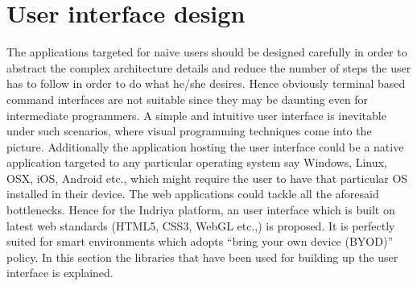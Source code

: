 % 
\section{User interface design}
\label{sec:ui_design}
The applications targeted for naive users should be designed carefully in order to abstract the complex architecture details and reduce the number of steps the user has to follow in order to do what he/she desires. Hence obviously terminal based command interfaces are not suitable since they may be daunting even for intermediate programmers. A simple and intuitive user interface is inevitable under such scenarios, where visual programming techniques come into the picture. Additionally the application hosting the user interface could be a native application targeted to any particular operating system say Windows, Linux, OSX, iOS, Android etc., which might require the user to have that particular OS installed in their device. The web applications could tackle all the aforesaid bottlenecks. Hence for the Indriya platform, an user interface which is built on latest web standards (HTML5, CSS3, WebGL etc.,) is proposed. It is perfectly suited for smart environments which adopts ``bring your own device (BYOD)'' policy. In this section the libraries that have been used for building up the user interface is explained.
